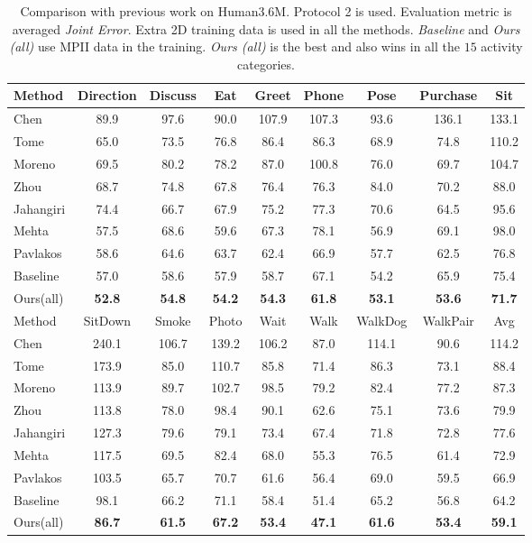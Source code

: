 \documentclass[10pt,twocolumn,letterpaper]{article}
\begin{document}
\begin{table*}
\centering
\small
\begin{tabular}{l|c|c|c|c|c|c|c|c}
\hline
Method & Direction 	& Discuss & Eat &Greet 	& Phone & Pose 	& Purchase	& Sit \\
\hline \hline
Chen\cite{chen20163d} & 89.9 & 97.6 & 90.0 & 107.9 & 107.3 & 93.6 & 136.1 & 133.1  \\
Tome\cite{tome2017lifting} & 65.0 & 73.5 & 76.8 & 86.4 & 86.3 & 68.9 & 74.8 & 110.2  \\
Moreno\cite{moreno20163d} & 69.5 & 80.2 & 78.2 & 87.0 & 100.8 & 76.0 & 69.7 & 104.7  \\
Zhou\cite{zhou2017monocap}& 68.7 & 74.8 & 67.8 & 76.4 & 76.3 & 84.0 & 70.2 & 88.0  \\
Jahangiri\cite{jahangiri2017generating}& 74.4 & 66.7 & 67.9 & 75.2 & 77.3 & 70.6 & 64.5 & 95.6  \\
Mehta\cite{mehta2016monocular}& 57.5 & 68.6 & 59.6 & 67.3 & 78.1 & 56.9 & 69.1 & 98.0  \\
Pavlakos\cite{pavlakos2016coarse}& 58.6 & 64.6 & 63.7 & 62.4 & 66.9  & 57.7 & 62.5 & 76.8 \\
\hline
Baseline  & 57.0 & 58.6 & 57.9 & 58.7 & 67.1 & 54.2 & 65.9 & 75.4  \\
Ours(all)  &\textbf{52.8} &\textbf{54.8} &\textbf{54.2} &\textbf{54.3} &\textbf{61.8} &\textbf{53.1} & \textbf{53.6} & \textbf{71.7}  \\
\hline \hline
Method & SitDown& Smoke 		& Photo   & Wait&Walk 	&WalkDog&WalkPair& Avg\\
\hline \hline
Chen\cite{chen20163d} & 240.1& 106.7 & 139.2 & 106.2 & 87.0 & 114.1 & 90.6 & 114.2 \\
Tome\cite{tome2017lifting} & 173.9& 85.0 & 110.7 & 85.8 & 71.4 & 86.3 & 73.1 & 88.4 \\
Moreno\cite{moreno20163d} & 113.9& 89.7 & 102.7 & 98.5 & 79.2 & 82.4 & 77.2 & 87.3 \\
Zhou\cite{zhou2017monocap}& 113.8& 78.0 & 98.4 & 90.1 & 62.6 & 75.1 & 73.6 & 79.9 \\
Jahangiri\cite{jahangiri2017generating}& 127.3& 79.6 & 79.1 & 73.4 & 67.4 & 71.8 & 72.8 & 77.6 \\
Mehta\cite{mehta2016monocular}& 117.5&69.5  & 82.4 & 68.0 & 55.3 & 76.5 & 61.4 & 72.9 \\
Pavlakos\cite{pavlakos2016coarse}& 103.5& 65.7 & 70.7 & 61.6 & 56.4 & 69.0 & 59.5 & 66.9 \\
\hline
Baseline & 98.1& 66.2 & 71.1 & 58.4 & 51.4 & 65.2 & 56.8 & 64.2 \\
Ours(all)& \textbf{86.7}& \textbf{61.5} & \textbf{67.2} & \textbf{53.4} & \textbf{47.1} & \textbf{61.6} & \textbf{53.4} & \textbf{59.1}\\
\end{tabular}
\caption{Comparison with previous work on Human3.6M. Protocol 2 is used. Evaluation metric is averaged \emph{Joint Error}. Extra 2D training data is used in all the methods. \emph{Baseline} and \emph{Ours (all)} use MPII data in the training. \emph{Ours (all)} is the best and also wins in all the $15$ activity categories.}
\label{table:hm36_p2_use_mpii}
\end{table*}
\end{document}
